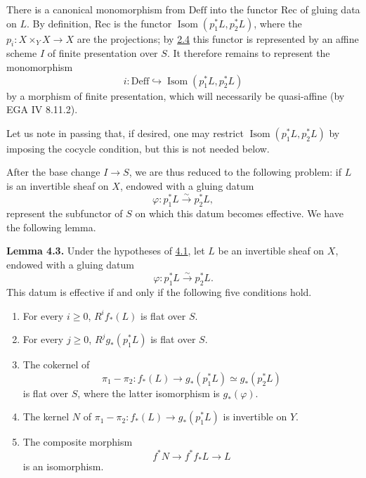 
\providecommand{\Isom}{\operatorname{Isom}}
\providecommand{\Coker}{\operatorname{Coker}}
\providecommand{\Ker}{\operatorname{Ker}}
\providecommand{\Supp}{\operatorname{Supp}}
\providecommand{\Ass}{\operatorname{Ass}}

There is a canonical monomorphism from \(\mathrm{Deff}\) into the functor
\(\mathrm{Rec}\) of gluing data on \(L\). By definition,
\(\mathrm{Rec}\) is the functor
\(\Isom(p_1^*L,p_2^*L)\), where the
\(p_i:X\times_YX\to X\) are the projections; by \hyperlink{sga6.e12.lem.2-4}{2.4} this functor is
represented by an affine scheme \(I\) of finite presentation over \(S\). It
therefore remains to represent the monomorphism
\[
  i:\mathrm{Deff}\hookrightarrow \Isom(p_1^*L,p_2^*L)
\]
by a morphism of finite presentation, which will necessarily be quasi-affine
(by EGA IV 8.11.2).

Let us note in passing that, if desired, one may restrict
\(\Isom(p_1^*L,p_2^*L)\) by imposing the cocycle condition, but this is not
needed below.

After the base change \(I\to S\), we are thus reduced to the following
problem: if \(L\) is an invertible sheaf on \(X\), endowed with a gluing datum
\[
  \varphi:p_1^*L\xrightarrow{\sim}p_2^*L,
\]
represent the subfunctor of \(S\) on which this datum becomes effective. We
have the following lemma.

\textbf{Lemma 4.3.} Under the hypotheses of \hyperlink{sga6.e12.prop.4-1}{4.1}, let \(L\) be an invertible
sheaf on \(X\), endowed with a gluing datum
\[
  \varphi:p_1^*L\xrightarrow{\sim}p_2^*L.
\]
This datum is effective if and only if the following five conditions hold.
\begin{enumerate}[label=\arabic*)]
\item For every \(i\geq0\), \(R^if_*(L)\) is flat over \(S\).
\item For every \(j\geq0\), \(R^jg_*(p_1^*L)\) is flat over \(S\).
\item The cokernel of
\[
  \pi_1-\pi_2:f_*(L)\longrightarrow
  g_*(p_1^*L)\simeq g_*(p_2^*L)
\]
is flat over \(S\), where the latter isomorphism is \(g_*(\varphi)\).
\item The kernel \(N\) of
\(\pi_1-\pi_2:f_*(L)\to g_*(p_1^*L)\) is invertible on \(Y\).
\item The composite morphism
\[
  f^*N\longrightarrow f^*f_*L\longrightarrow L
\]
is an isomorphism.
\end{enumerate}

